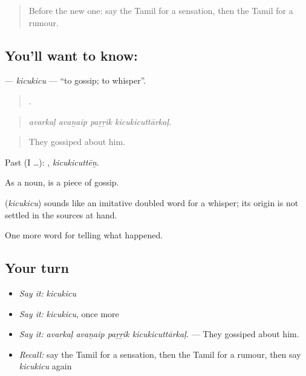 \label{lesson:TA-C308-kicukicu}



\begin{quote}
Before the new one: say the Tamil for a sensation, then the Tamil for a rumour.
\end{quote}

\subsection*{You'll want to know: }
\textbf{} — \emph{kicukicu} — \textquotedblleft{}to gossip; to whisper\textquotedblright{}.

\begin{quote}
   .
\end{quote}

\begin{quote}
\emph{avarkaḷ avaṉaip paṟṟik kicukicuttārkaḷ.}
\end{quote}

\begin{quote}
They gossiped about him.
\end{quote}

Past (I …): , \emph{kicukicuttēṉ}.

As a noun,  is a piece of gossip.

\begin{cousinweb}
\textbf{} (\emph{kicukicu}) sounds like an imitative doubled word for a whisper; its origin is not settled in the sources at hand.
\end{cousinweb}

\begin{grammarlens}[title={What you've built}]
One more word for telling what happened.
\end{grammarlens}

\subsection*{Your turn}
\begin{itemize}
\raggedright
  \item \emph{Say it:} \emph{kicukicu}
  \item \emph{Say it:} \emph{kicukicu}, once more
  \item \emph{Say it:} \emph{avarkaḷ avaṉaip paṟṟik kicukicuttārkaḷ.} — They gossiped about him.
  \item \emph{Recall:} say the Tamil for a sensation, then the Tamil for a rumour, then say \emph{kicukicu} again
\end{itemize}

